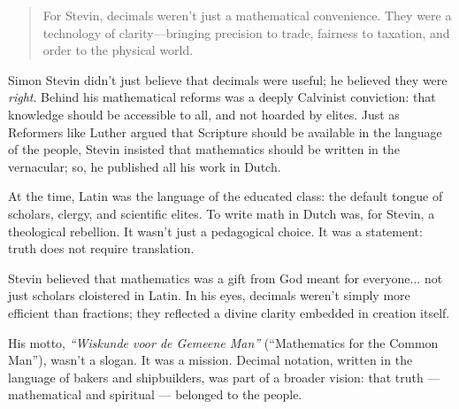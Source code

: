 \begin{quote}
For Stevin, decimals weren’t just a mathematical convenience. They were a technology of clarity—bringing precision to trade, fairness to taxation, and order to the physical world.
\end{quote}


\begin{tcolorbox}[colback=gray!5!white, colframe=black!80!white, title={Historical Sidenote: Stevin’s Theology of Decimal Math}, fonttitle=\bfseries, arc=1.5mm, boxrule=0.4pt]

    Simon Stevin didn’t just believe that decimals were useful; he believed they were \textit{right}. Behind his mathematical reforms was a deeply Calvinist conviction: that knowledge should be accessible to all, and not hoarded by elites. Just as Reformers like Luther argued that Scripture should be available in the language of the people, Stevin insisted that mathematics should be written in the vernacular; so, he published all his work in Dutch.

    \medskip

    At the time, Latin was the language of the educated class: the default tongue of scholars, clergy, and scientific elites. To write math in Dutch was, for Stevin, a theological rebellion. It wasn’t just a pedagogical choice. It was a statement: truth does not require translation.

    \medskip
    
    Stevin believed that mathematics was a gift from God meant for everyone... not just scholars cloistered in Latin. In his eyes, decimals weren’t simply more efficient than fractions; they reflected a divine clarity embedded in creation itself.

    \medskip
    
    His motto, \textit{“Wiskunde voor de Gemeene Man”} (“Mathematics for the Common Man”), wasn’t a slogan. It was a mission. Decimal notation, written in the language of bakers and shipbuilders, was part of a broader vision: that truth --- mathematical and spiritual --- belonged to the people.

\end{tcolorbox}


